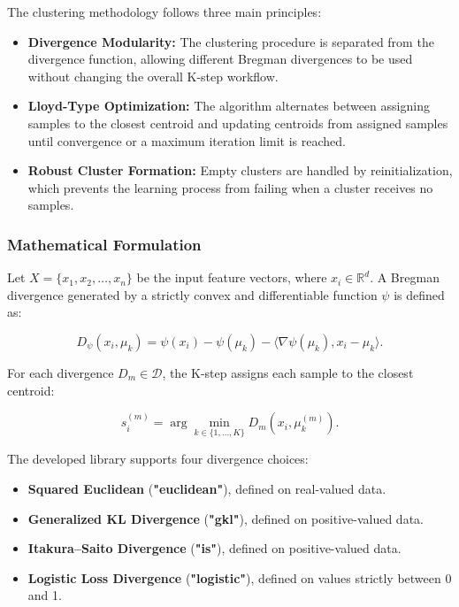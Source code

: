 The clustering methodology follows three main principles:

\begin{itemize}
    \item \textbf{Divergence Modularity:} The clustering procedure is separated from the divergence function, allowing different Bregman divergences to be used without changing the overall K-step workflow.

    \item \textbf{Lloyd-Type Optimization:} The algorithm alternates between assigning samples to the closest centroid and updating centroids from assigned samples until convergence or a maximum iteration limit is reached.

    \item \textbf{Robust Cluster Formation:} Empty clusters are handled by reinitialization, which prevents the learning process from failing when a cluster receives no samples.
\end{itemize}

\subsubsection*{Mathematical Formulation}

Let $X = \{x_1, x_2, \dots, x_n\}$ be the input feature vectors, where $x_i \in \mathbb{R}^d$. A Bregman divergence generated by a strictly convex and differentiable function $\psi$ is defined as:

\[
    D_{\psi}(x_i, \mu_k) =
    \psi(x_i) - \psi(\mu_k)
    - \langle \nabla \psi(\mu_k), x_i - \mu_k \rangle.
\]

For each divergence $D_m \in \mathcal{D}$, the K-step assigns each sample to the closest centroid:

\[
    s_i^{(m)} = \arg\min_{k \in \{1, \dots, K\}} D_m(x_i, \mu_k^{(m)}).
\]

The developed library supports four divergence choices:

\begin{itemize}
    \item \textbf{Squared Euclidean} (\textbf{"euclidean"}), defined on real-valued data.
    \item \textbf{Generalized KL Divergence} (\textbf{"gkl"}), defined on positive-valued data.
    \item \textbf{Itakura--Saito Divergence} (\textbf{"is"}), defined on positive-valued data.
    \item \textbf{Logistic Loss Divergence} (\textbf{"logistic"}), defined on values strictly between 0 and 1.
\end{itemize}

